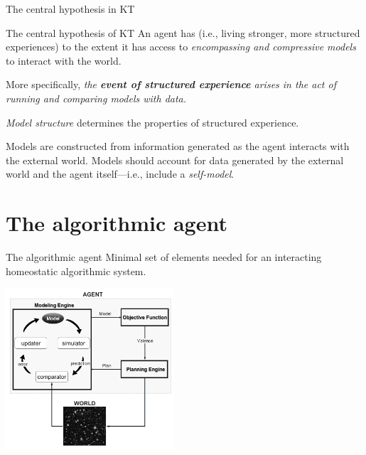 \begin{frame}[label=ladila]{The central hypothesis in KT}

\begin{exampleblock}{The central hypothesis of KT}
An agent has \SEP (i.e., living stronger, more structured experiences) to the extent it has access to {\em encompassing and compressive models}  to interact with the world.  

\vspace{0.5cm}

More specifically,  {\em the \textbf{event of structured experience} arises in the act of running and comparing models with data.}
\vspace{0.5cm}

\textit{Model structure} determines the properties of structured experience. \vspace{0.5cm}

\end{exampleblock}
 \vfill
   Models are constructed from information generated as the agent interacts with the external world. Models should account for data generated by the external world and the agent itself---i.e., include a {\em self-model}.

 

\end{frame}


\section{The algorithmic agent}

\begin{frame}[label=ladila]{The algorithmic agent}
Minimal set of elements needed for an interacting homeostatic algorithmic system. %
 \begin{center}
  \includegraphics[height=6cm]{img/Figure1_StructuredDynamics.png}
  \end{center}

\end{frame}







